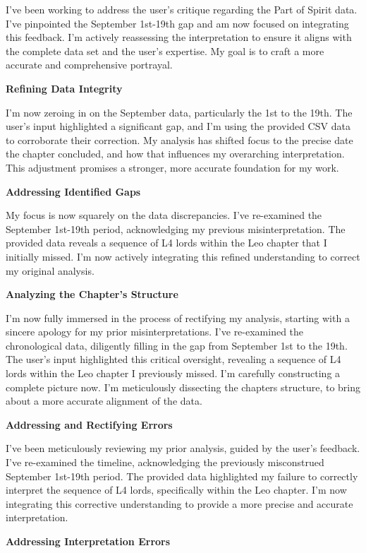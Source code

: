 \documentclass{article}
\begin{document}
I've been working to address the user's critique regarding the Part of Spirit data. I've pinpointed the September 1st-19th gap and am now focused on integrating this feedback. I'm actively reassessing the interpretation to ensure it aligns with the complete data set and the user's expertise. My goal is to craft a more accurate and comprehensive portrayal.

\textbf{Refining Data Integrity}

I'm now zeroing in on the September data, particularly the 1st to the 19th. The user's input highlighted a significant gap, and I'm using the provided CSV data to corroborate their correction. My analysis has shifted focus to the precise date the chapter concluded, and how that influences my overarching interpretation. This adjustment promises a stronger, more accurate foundation for my work.

\textbf{Addressing Identified Gaps}

My focus is now squarely on the data discrepancies. I've re-examined the September 1st-19th period, acknowledging my previous misinterpretation. The provided data reveals a sequence of L4 lords within the Leo chapter that I initially missed. I'm now actively integrating this refined understanding to correct my original analysis.

\textbf{Analyzing the Chapter's Structure}

I'm now fully immersed in the process of rectifying my analysis, starting with a sincere apology for my prior misinterpretations. I've re-examined the chronological data, diligently filling in the gap from September 1st to the 19th. The user's input highlighted this critical oversight, revealing a sequence of L4 lords within the Leo chapter I previously missed. I'm carefully constructing a complete picture now. I'm meticulously dissecting the chapters structure, to bring about a more accurate alignment of the data.

\textbf{Addressing and Rectifying Errors}

I've been meticulously reviewing my prior analysis, guided by the user's feedback. I've re-examined the timeline, acknowledging the previously misconstrued September 1st-19th period. The provided data highlighted my failure to correctly interpret the sequence of L4 lords, specifically within the Leo chapter. I'm now integrating this corrective understanding to provide a more precise and accurate interpretation.

\textbf{Addressing Interpretation Errors}
\end{document}
